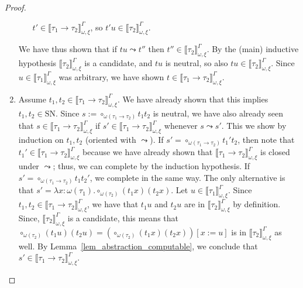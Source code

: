 \documentclass[runningheads,a4paper]{llncs}
\newcommand{\abs}[2]{\lambda #1.#2}
\newcommand{\SN}{\mathrm{SN}}
\newcommand{\val}[3]{\ensuremath{\llbracket#1\rrbracket_{#2}^{#3}}}
\begin{document}
\begin{proof}
\begin{enumerate}
\begin{itemize}
      $t' \in \val{\tau_1\to\tau_2}{\omega,\xi}{\Gamma}$, so
      $t' u \in \val{\tau_2}{\omega,\xi}{\Gamma}$.
    \end{itemize}
    We have thus shown that if $t u \leadsto t''$ then
    $t'' \in \val{\tau_2}{\omega,\xi}{\Gamma}$. By the (main)
    inductive hypothesis $\val{\tau_2}{\omega,\xi}{\Gamma}$ is a
    candidate, and $t u$ is neutral, so also
    $t u \in \val{\tau_2}{\omega,\xi}{\Gamma}$. Since
    $u \in \val{\tau_1}{\omega,\xi}{\Gamma}$ was arbitrary, we have
    shown $t \in \val{\tau_1\to\tau_2}{\omega,\xi}{\Gamma}$.
  \item Assume $t_1,t_2 \in \val{\tau_1\to\tau_2}{\omega,\xi}{\Gamma}$.
    We have already shown that this implies $t_1,t_2 \in \SN$.
    Since $s := \circ_{\omega(\tau_1\to\tau_2)} t_1 t_2$ is neutral,
    we have also already seen that $s \in \val{\tau_1\to\tau_2}{\omega,
    \xi}{\Gamma}$ if $s' \in \val{\tau_1\to\tau_2}{\omega,\xi}{\Gamma}$
    whenever $s \leadsto s'$.
    This we show by induction on $t_1,t_2$ (oriented with $\leadsto$).
    If $s' = \circ_{\omega(\tau_1\to\tau_2)} t_1' t_2$, then note that
    $t_1' \in \val{\tau_1\to\tau_2}{\omega,\xi}{\Gamma}$ because we
    have already shown that $\val{\tau_1\to\tau_2}{\omega,\xi}{\Gamma}$
    is closed under $\leadsto$; thus, we can complete by the induction
    hypothesis.
    If $s' = \circ_{\omega(\tau_1\to\tau_2)} t_1 t_2'$, we complete in
    the same way.
    The only alternative is that $s' = \abs{x:\omega(\tau_1)}{\circ_{
    \omega(\tau_2)} (t_1 x) (t_2 x)}$.
    Let $u \in \val{\tau_1}{\omega,\xi}{\Gamma}$.  Since $t_1,t_2 \in
    \val{\tau_1\to\tau_2}{\omega,\xi}{\Gamma}$, we have that $t_1 u$
    and $t_2 u$ are in $\val{\tau_2}{\omega,\xi}{\Gamma}$ by
    definition.  Since, $\val{\tau_2}{\omega,\xi}{\Gamma}$ is a
    candidate, this means that $\circ_{\omega(\tau_2)} (t_1 u) (t_2 u) =
    (\circ_{\omega(\tau_2)} (t_1 x) (t_2 x))[x:=u]$ is in
    $\val{\tau_2}{\omega,\xi}{\Gamma}$ as well.  By
    Lemma~\ref{lem_abstraction_computable}, we conclude that $s' \in
    \val{\tau_1\to\tau_2}{\omega,\xi}{\Gamma}$.
  \end{enumerate}


\end{proof}
\end{document}
